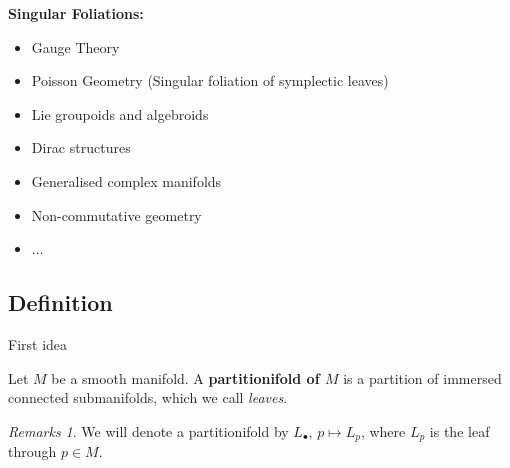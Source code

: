 \documentclass[hyperref={pdfpagelabels=false}]{beamer}
\newcommand\insertreferences{}
\theoremstyle{plain}
\theoremstyle{remark}
\newtheorem*{remark}{Remarks}
\begin{document}
{\begin{frame}
\end{frame}
}

{
\begin{frame}
\textbf{Singular Foliations:}

\begin{itemize}
	\item Gauge Theory
	\item Poisson Geometry \newline (Singular foliation of symplectic leaves)
	\item Lie groupoids and algebroids
	\item Dirac structures
	\item Generalised complex manifolds
	\item Non-commutative geometry
	\item $\dotsc$
\end{itemize}

\end{frame}
}

\subsection{Definition}

\renewcommand\insertreferences{{\tiny  Peter Stefan, Accessible sets, orbits, and foliations with singularities. \textit{Proc.\ London Math.\ Soc.}, 29, 1974.
\newline
Héctor J. Sussmann, Orbits of families of vector fields and integrability of distributions. \textit{Trans.\ Amer.\ Math.\ Soc.}, 180, 1973}}

\begin{frame}{First idea}
\begin{definition}[Partitionifolds]
Let $M$ be a smooth manifold. A \textbf{partitionifold of $M$} is a partition of immersed connected submanifolds, which we call \emph{leaves}.
\end{definition}

\begin{remark}
We will denote a partitionifold by $L_\bullet$, $p \mapsto L_p$, where $L_p$ is the leaf through $p \in M$.
\end{remark}
\end{frame}
\end{document}
